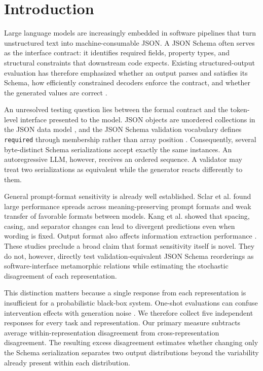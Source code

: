 \documentclass[10pt]{article}
\begin{document}
\section{Introduction}
Large language models are increasingly embedded in software pipelines that turn unstructured text into machine-consumable JSON. A JSON Schema often serves as the interface contract: it identifies required fields, property types, and structural constraints that downstream code expects. Existing structured-output evaluation has therefore emphasized whether an output parses and satisfies its Schema, how efficiently constrained decoders enforce the contract, and whether the generated values are correct \citep{geng2025jsonschemabench,singh2026sob}.

An unresolved testing question lies between the formal contract and the token-level interface presented to the model. JSON objects are unordered collections in the JSON data model \citep{rfc8259}, and the JSON Schema validation vocabulary defines \texttt{required} through membership rather than array position \citep{jsonschema2020validation}. Consequently, several byte-distinct Schema serializations accept exactly the same instances. An autoregressive LLM, however, receives an ordered sequence. A validator may treat two serializations as equivalent while the generator reacts differently to them.

General prompt-format sensitivity is already well established. Sclar et al. \citeyearpar{sclar2024format} found large performance spreads across meaning-preserving prompt formats and weak transfer of favorable formats between models. Kang et al. \citeyearpar{kang2025format} showed that spacing, casing, and separator changes can lead to divergent predictions even when wording is fixed. Output format also affects information extraction performance \citep{ravikumar2026lost}. These studies preclude a broad claim that format sensitivity itself is novel. They do not, however, directly test validation-equivalent JSON Schema reorderings as software-interface metamorphic relations while estimating the stochastic disagreement of each representation.

This distinction matters because a single response from each representation is insufficient for a probabilistic black-box system. One-shot evaluations can confuse intervention effects with generation noise \citep{song2024nondeterminism,bouthillier2021variance}. We therefore collect five independent responses for every task and representation. Our primary measure subtracts average within-representation disagreement from cross-representation disagreement. The resulting excess disagreement estimates whether changing only the Schema serialization separates two output distributions beyond the variability already present within each distribution.
\end{document}
